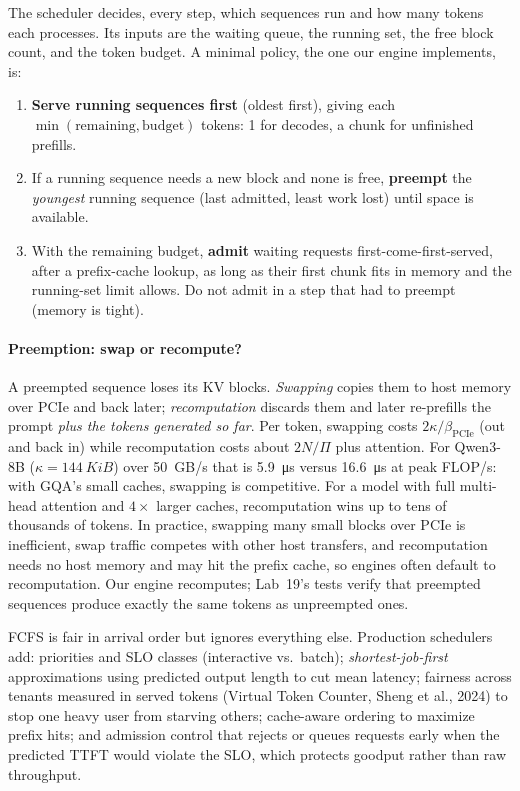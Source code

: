 The scheduler decides, every step, which sequences run and how many tokens each processes. Its inputs
are the waiting queue, the running set, the free block count, and the token budget. A minimal policy,
the one our engine implements, is:
\begin{enumerate}
  \item \textbf{Serve running sequences first} (oldest first), giving each $\min(\text{remaining},
    \text{budget})$ tokens: 1 for decodes, a chunk for unfinished prefills.
  \item If a running sequence needs a new block and none is free, \textbf{preempt} the \emph{youngest}
    running sequence (last admitted, least work lost) until space is available.
  \item With the remaining budget, \textbf{admit} waiting requests first-come-first-served, after a
    prefix-cache lookup, as long as their first chunk fits in memory and the running-set limit allows.
    Do not admit in a step that had to preempt (memory is tight).
\end{enumerate}

\paragraph{Preemption: swap or recompute?} A preempted sequence loses its KV blocks. \emph{Swapping}
copies them to host memory over PCIe and back later; \emph{recomputation} discards them and later
re-prefills the prompt \emph{plus the tokens generated so far}. Per token, swapping costs
$2\kappa/\beta_{\text{PCIe}}$ (out and back in) while recomputation costs about $2N/\Pi$ plus attention.
For Qwen3-8B ($\kappa=\SI{144}{KiB}$) over \SI{50}{GB/s} that is \SI{5.9}{\micro s} versus
\SI{16.6}{\micro s} at peak FLOP/s: with GQA's small caches, swapping is competitive. For a model with
full multi-head attention and $4\times$ larger caches, recomputation wins up to tens of thousands of
tokens. In practice, swapping many small blocks over PCIe is inefficient, swap traffic competes with
other host transfers, and recomputation needs no host memory and may hit the prefix cache, so engines
often default to recomputation. Our engine recomputes; Lab~19's tests verify that preempted sequences produce exactly the
same tokens as unpreempted ones.

\begin{systemslens}
FCFS is fair in arrival order but ignores everything else. Production schedulers add: priorities and
SLO classes (interactive vs.\ batch); \emph{shortest-job-first} approximations using predicted output
length to cut mean latency; fairness across tenants measured in served tokens (Virtual Token Counter,
Sheng et al., 2024) to stop one heavy user from starving others; cache-aware ordering to maximize
prefix hits; and admission control that rejects or queues requests early when the predicted TTFT would
violate the SLO, which protects goodput rather than raw throughput.
\end{systemslens}

